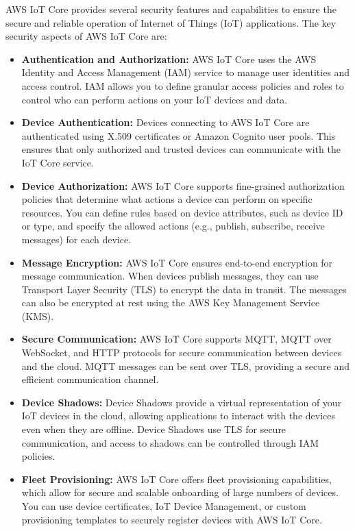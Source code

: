 AWS IoT Core provides several security features and capabilities to ensure the secure and reliable operation of Internet of Things (IoT) applications.
The key security aspects of AWS IoT Core are:

\begin{itemize}
	\item \textbf{Authentication and Authorization:} AWS IoT Core uses the AWS Identity and Access Management (IAM) service to manage user identities and access control. IAM allows you to define granular access policies and roles to control who can perform actions on your IoT devices and data.
	
	\item \textbf{Device Authentication:} Devices connecting to AWS IoT Core are authenticated using X.509 certificates or Amazon Cognito user pools. This ensures that only authorized and trusted devices can communicate with the IoT Core service.
	
	\item \textbf{Device Authorization:} AWS IoT Core supports fine-grained authorization policies that determine what actions a device can perform on specific resources. You can define rules based on device attributes, such as device ID or type, and specify the allowed actions (e.g., publish, subscribe, receive messages) for each device.
	
	\item \textbf{Message Encryption:} AWS IoT Core ensures end-to-end encryption for message communication. When devices publish messages, they can use Transport Layer Security (TLS) to encrypt the data in transit. The messages can also be encrypted at rest using the AWS Key Management Service (KMS).
	
	\item \textbf{Secure Communication:} AWS IoT Core supports MQTT, MQTT over WebSocket, and HTTP protocols for secure communication between devices and the cloud. MQTT messages can be sent over TLS, providing a secure and efficient communication channel.
	
	\item \textbf{Device Shadows:} Device Shadows provide a virtual representation of your IoT devices in the cloud, allowing applications to interact with the devices even when they are offline. Device Shadows use TLS for secure communication, and access to shadows can be controlled through IAM policies.
	
	\item \textbf{Fleet Provisioning:} AWS IoT Core offers fleet provisioning capabilities, which allow for secure and scalable onboarding of large numbers of devices. You can use device certificates, IoT Device Management, or custom provisioning templates to securely register devices with AWS IoT Core.
	

\end{itemize}
